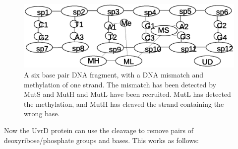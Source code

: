 \documentclass[review]{elsarticle}
\begin{document}
\begin{figure}[h!]
  \centering
    \includegraphics[width=1.0\textwidth]{mmr/state2}
  \caption[A six base pair DNA fragment.]{A six base pair DNA fragment, with a DNA mismatch and methylation of one strand. The mismatch has been detected by MutS and MutH and MutL have been recruited. MutL has detected the methylation, and MutH has cleaved the strand containing the wrong base.}
  \label{fig:state2}
\end{figure}

 Now the UvrD protein can use the cleavage to remove pairs of deoxyribose/phosphate groups and bases. This works as follows:
\end{document}
